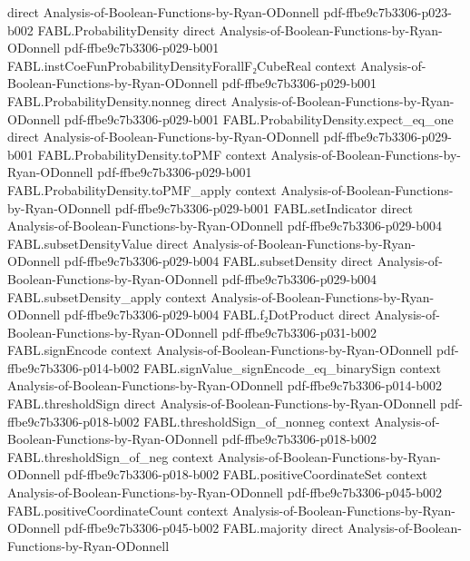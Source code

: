 \begin{theorem}
  {direct}
  {Analysis-of-Boolean-Functions-by-Ryan-ODonnell}
  {pdf-ffbe9c7b3306-p023-b002}
\proofstep
  {FABL.ProbabilityDensity}
  {direct}
  {Analysis-of-Boolean-Functions-by-Ryan-ODonnell}
  {pdf-ffbe9c7b3306-p029-b001}
\proofstep
  {FABL.instCoeFunProbabilityDensityForallF₂CubeReal}
  {context}
  {Analysis-of-Boolean-Functions-by-Ryan-ODonnell}
  {pdf-ffbe9c7b3306-p029-b001}
\proofstep
  {FABL.ProbabilityDensity.nonneg}
  {direct}
  {Analysis-of-Boolean-Functions-by-Ryan-ODonnell}
  {pdf-ffbe9c7b3306-p029-b001}
\proofstep
  {FABL.ProbabilityDensity.expect_eq_one}
  {direct}
  {Analysis-of-Boolean-Functions-by-Ryan-ODonnell}
  {pdf-ffbe9c7b3306-p029-b001}
\proofstep
  {FABL.ProbabilityDensity.toPMF}
  {context}
  {Analysis-of-Boolean-Functions-by-Ryan-ODonnell}
  {pdf-ffbe9c7b3306-p029-b001}
\proofstep
  {FABL.ProbabilityDensity.toPMF_apply}
  {context}
  {Analysis-of-Boolean-Functions-by-Ryan-ODonnell}
  {pdf-ffbe9c7b3306-p029-b001}
\proofstep
  {FABL.setIndicator}
  {direct}
  {Analysis-of-Boolean-Functions-by-Ryan-ODonnell}
  {pdf-ffbe9c7b3306-p029-b004}
\proofstep
  {FABL.subsetDensityValue}
  {direct}
  {Analysis-of-Boolean-Functions-by-Ryan-ODonnell}
  {pdf-ffbe9c7b3306-p029-b004}
\proofstep
  {FABL.subsetDensity}
  {direct}
  {Analysis-of-Boolean-Functions-by-Ryan-ODonnell}
  {pdf-ffbe9c7b3306-p029-b004}
\proofstep
  {FABL.subsetDensity_apply}
  {context}
  {Analysis-of-Boolean-Functions-by-Ryan-ODonnell}
  {pdf-ffbe9c7b3306-p029-b004}
\proofstep
  {FABL.f₂DotProduct}
  {direct}
  {Analysis-of-Boolean-Functions-by-Ryan-ODonnell}
  {pdf-ffbe9c7b3306-p031-b002}
\proofstep
  {FABL.signEncode}
  {context}
  {Analysis-of-Boolean-Functions-by-Ryan-ODonnell}
  {pdf-ffbe9c7b3306-p014-b002}
\proofstep
  {FABL.signValue_signEncode_eq_binarySign}
  {context}
  {Analysis-of-Boolean-Functions-by-Ryan-ODonnell}
  {pdf-ffbe9c7b3306-p014-b002}
\proofstep
  {FABL.thresholdSign}
  {direct}
  {Analysis-of-Boolean-Functions-by-Ryan-ODonnell}
  {pdf-ffbe9c7b3306-p018-b002}
\proofstep
  {FABL.thresholdSign_of_nonneg}
  {context}
  {Analysis-of-Boolean-Functions-by-Ryan-ODonnell}
  {pdf-ffbe9c7b3306-p018-b002}
\proofstep
  {FABL.thresholdSign_of_neg}
  {context}
  {Analysis-of-Boolean-Functions-by-Ryan-ODonnell}
  {pdf-ffbe9c7b3306-p018-b002}
\proofstep
  {FABL.positiveCoordinateSet}
  {context}
  {Analysis-of-Boolean-Functions-by-Ryan-ODonnell}
  {pdf-ffbe9c7b3306-p045-b002}
\proofstep
  {FABL.positiveCoordinateCount}
  {context}
  {Analysis-of-Boolean-Functions-by-Ryan-ODonnell}
  {pdf-ffbe9c7b3306-p045-b002}
\proofstep
  {FABL.majority}
  {direct}
  {Analysis-of-Boolean-Functions-by-Ryan-ODonnell}

\end{theorem}
